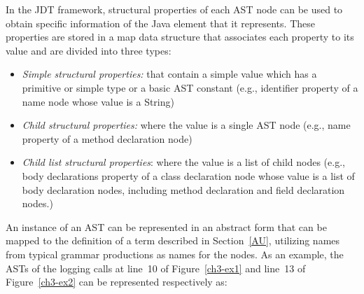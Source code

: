In the JDT framework, structural properties of each AST node can be used to obtain specific information of the Java element that it represents. These properties are stored in a map data structure that associates each property to its value and are divided into three types:
\begin{itemize} [leftmargin=0.7in]
\item \textit{Simple structural properties:} that contain a simple value which has a primitive or simple type or a basic AST constant (e.g., identifier property of a name node whose value is a String)
\item \textit{Child structural properties:} where the value is a single AST node (e.g., name property of a method declaration node)
\item \textit{Child list structural properties}: where the value is a list of child nodes (e.g., body declarations property of a class declaration node whose value is a list of body declaration nodes, including method declaration and field declaration nodes.)
\end{itemize}
An instance of an AST can be represented in an abstract form that can be mapped to the definition of a term described in Section~\ref{AU}, utilizing names from typical grammar productions \cite[e.g.,][]{2012:book:gosling} as names for the nodes. As an example, the ASTs of the logging calls at line~10 of Figure~\ref{ch3-ex1} and line~13 of Figure~\ref{ch3-ex2} can be represented respectively as:
